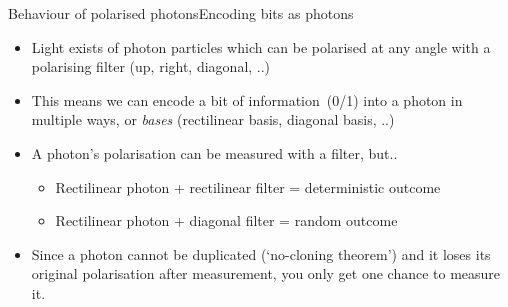\documentclass{beamer}
\begin{document}
\begin{frame}{Behaviour of polarised photons}{Encoding bits as photons}

    \begin{itemize}
        \item Light exists of photon particles which can be polarised at any angle with a polarising filter (up, right, diagonal, ..)
        \item This means we can encode a bit of information~(0/1) into a photon in multiple ways, or \emph{bases} (rectilinear basis, diagonal basis, ..)
        \item A photon's polarisation can be measured with a filter, but..
        \begin{itemize}
            \item Rectilinear photon + rectilinear filter = deterministic outcome
            \item Rectilinear photon + diagonal filter = random outcome
        \end{itemize}
        \item Since a photon cannot be duplicated (`no-cloning theorem') and it loses its original polarisation after measurement, you only get one chance to measure it.
    \end{itemize}



\end{frame}
\end{document}

